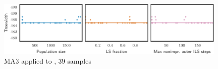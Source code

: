 \begin{figure}[h]\strictpagecheck\centering

\includegraphics[scale=0.85]{plots/MA3-correlation-regplots-DSJR500-1c-0-crop.pdf}


\caption[Parameter influence for MA3 when applied to ]{\gls{MA3} applied to , 39 samples}

\label{MA3-correlation-regplots-DSJR500-1c}

\end{figure}